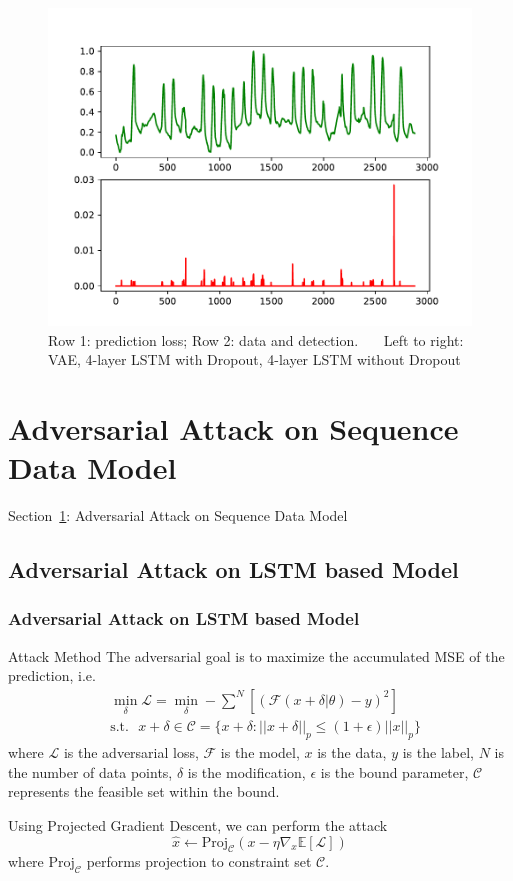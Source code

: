 \documentclass{beamer}
\begin{document}
\begin{frame}
\begin{figure}
\includegraphics[width=0.32\linewidth]{figs/lstm_h20_detect_4layer.pdf}
\caption{Row 1: prediction loss; Row 2: data and detection. \ \ \ Left to right: VAE, 4-layer LSTM with Dropout, 4-layer LSTM without Dropout}
\end{figure}
\vspace{-0.1in}


\end{frame}


\section{Adversarial Attack on Sequence Data Model}
\label{sec-advattack}
\begin{frame}
\centerline{Section~\ref{sec-advattack}: Adversarial Attack on Sequence Data Model}
\end{frame}

\subsection{Adversarial Attack on LSTM based Model}
\begin{frame}
\frametitle{Adversarial Attack on LSTM based Model}
\begin{block}{Attack Method}
The adversarial goal is to maximize the accumulated MSE of the prediction, i.e.
\[
\begin{split}
& \min_\delta \mathcal{L} = \min_\delta -\sum^N[(\mathcal{F}(x+\delta | \theta) - y)^2] \\
& \text{s.t.} \ \ \ x+\delta \in \mathcal{C} = \{x+\delta: ||x+\delta||_p \leq (1+\epsilon)||x||_p\}
\end{split}
\]
where $\mathcal{L}$ is the adversarial loss, $\mathcal{F}$ is the model, $x$ is the data, $y$ is the label, $N$ is the number of data points, $\delta$ is the modification, $\epsilon$ is the bound parameter, $\mathcal{C}$ represents the feasible set within the bound.

Using Projected Gradient Descent, we can perform the attack
\[
\hat{x} \leftarrow \text{Proj}_\mathcal{C} (x - \eta \nabla_x \mathbb{E}[\mathcal{L}])
\]
where $\text{Proj}_\mathcal{C}$ performs projection to constraint set $\mathcal{C}$.
\end{block}

\end{frame}
\end{document}
